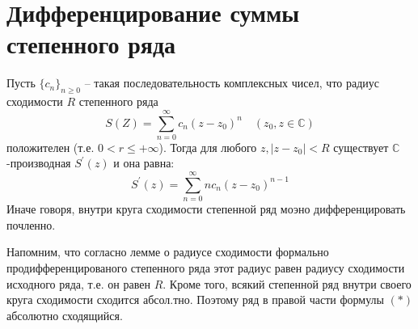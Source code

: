 \documentclass[main]{subfiles}
\begin{document}
\section{Дифференцирование суммы степенного ряда}
\begin{theorem}
    Пусть $\{ c_n \}_{n \geq 0}$ -- такая последовательность комплексных чисел, что радиус сходимости $R$ степенного ряда
    \[ S(Z) = \sum^\infty_{n=0}c_n (z-z_0)^n \quad (z_0, z \in \mathbb{C}) \]
    положителен (т.е. $0 < r \leq + \infty$). Тогда для любого $z, |z-z_0| < R$ существует $\mathbb{C}$-производная
    $S^\prime(z)$ и она равна:
    \[ S^\prime(z) = \sum^\infty_{n=0} nc_n(z-z_0)^{n-1} \tag{*} \]
    Иначе говоря, внутри круга сходимости степенной ряд моэно дифференцировать почленно.

    Напомним, что согласно лемме о радиусе сходимости формально продифференцированого степенного ряда этот радиус
    равен радиусу сходимости исходного ряда, т.е. он равен $R$. Кроме того, всякий степенной ряд внутри
    своего круга сходимости сходится абсол.тно. Поэтому ряд в правой части формулы $(*)$ абсолютно сходящийся.
\end{theorem}
\end{document}
